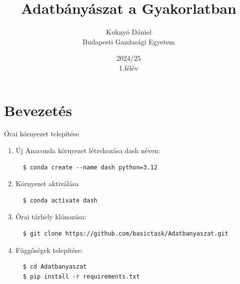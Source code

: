 \documentclass[english, aspectratio=169]{beamer}
\makeatletter
\newcommand\makebeamertitle{\frame{\maketitle}}
\let\origtableofcontents=\tableofcontents
\def\tableofcontents{\@ifnextchar[{\origtableofcontents}{\gobbletableofcontents}}
\def\gobbletableofcontents#1{\origtableofcontents}
\makeatother
\begin{document}
\section{Bevezetés}
\title[]{Adatbányászat a Gyakorlatban}
\subtitle{}
\author[Kuknyó Dániel]{Kuknyó Dániel\\Budapesti Gazdasági Egyetem}
\date{2024/25\\1.félév}
\makebeamertitle

\begin{frame}
\tableofcontents{}
\end{frame}

\begin{frame}
\tableofcontents[currentsection]
\end{frame}

\begin{frame}[fragile]{Órai környezet telepítése}
\begin{enumerate}
  \item Új Anaconda környezet létrehozása dash néven:
  \begin{lstlisting}
  $ conda create --name dash python=3.12
  \end{lstlisting}
  \item Környezet aktiválása
  \begin{lstlisting}
  $ conda activate dash
  \end{lstlisting}
  \item Órai tárhely klónozása:
  \begin{lstlisting}
  $ git clone https://github.com/basictask/Adatbanyaszat.git
  \end{lstlisting}
  \item Függőségek telepítése:
  \begin{lstlisting}
  $ cd Adatbanyaszat
  $ pip install -r requirements.txt
  \end{lstlisting}
\end{enumerate}
\end{frame}
\end{document}
